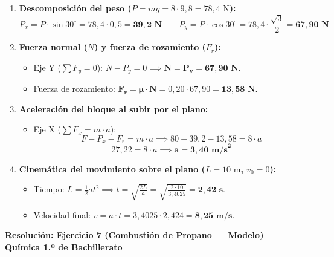 \documentclass[11pt,a4paper]{article}
\begin{document}
\vspace{-0.1cm}
\begin{enumerate}[label=\textbf{\alph*)}, leftmargin=2em, itemsep=4pt]
    \item \textbf{Descomposición del peso ($P = mg = 8 \cdot 9{,}8 = 78{,}4\text{ N}$):}
    \[
    P_x = P \cdot \sin 30^\circ = 78{,}4 \cdot 0{,}5 = \mathbf{39{,}2\text{ N}} \qquad P_y = P \cdot \cos 30^\circ = 78{,}4 \cdot \frac{\sqrt{3}}{2} = \mathbf{67{,}90\text{ N}}
    \]

    \item \textbf{Fuerza normal ($N$) y fuerza de rozamiento ($F_r$):}
    \begin{itemize}[leftmargin=1.5em, itemsep=2pt]
        \item Eje Y ($\sum F_y = 0$): $N - P_y = 0 \implies \mathbf{N = P_y = 67{,}90\text{ N}}$.
        \item Fuerza de rozamiento: $\mathbf{F_r = \mu \cdot N} = 0{,}20 \cdot 67{,}90 = \mathbf{13{,}58\text{ N}}$.
    \end{itemize}

    \item \textbf{Aceleración del bloque al subir por el plano:}
    \begin{itemize}[leftmargin=1.5em, itemsep=2pt]
        \item Eje X ($\sum F_x = m \cdot a$):
        \[
        F - P_x - F_r = m \cdot a \implies 80 - 39{,}2 - 13{,}58 = 8 \cdot a
        \]
        \[
        27{,}22 = 8 \cdot a \implies \mathbf{a = 3{,}40\text{ m/s}^2}
        \]
    \end{itemize}

    \item \textbf{Cinemática del movimiento sobre el plano ($L = 10\text{ m}$, $v_0 = 0$):}
    \begin{itemize}[leftmargin=1.5em, itemsep=2pt]
        \item Tiempo: $L = \frac{1}{2}at^2 \implies t = \sqrt{\frac{2L}{a}} = \sqrt{\frac{2 \cdot 10}{3{,}4025}} = \mathbf{2{,}42\text{ s}}$.
        \item Velocidad final: $v = a \cdot t = 3{,}4025 \cdot 2{,}424 = \mathbf{8{,}25\text{ m/s}}$.
    \end{itemize}
\end{enumerate}

\newpage

\begin{center}
    {\LARGE \textbf{Resolución: Ejercicio 7 (Combustión de Propano — Modelo)}}\\[4pt]
    {\large \textbf{Química 1.º de Bachillerato}}
\end{center}
\end{document}
